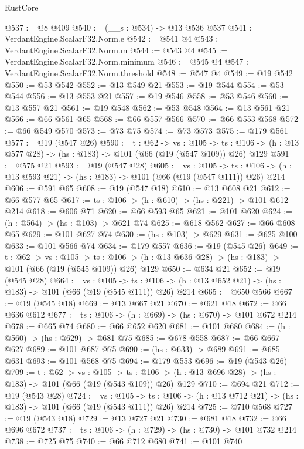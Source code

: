 \begin{lexlean}{RustCore}
\begin{coremodule}
@537 := @8 @409
@540 := (__s : @534) -> @13 @536 @537
@541 := VerdantEngine.ScalarF32.Norm.e
@542 := @541 @4
@543 := VerdantEngine.ScalarF32.Norm.m
@544 := @543 @4
@545 := VerdantEngine.ScalarF32.Norm.minimum
@546 := @545 @4
@547 := VerdantEngine.ScalarF32.Norm.threshold
@548 := @547 @4
@549 := @19 @542
@550 := @53 @542
@552 := @13 @549 @21
@553 := @19 @544
@554 := @53 @544
@556 := @13 @553 @21
@557 := @19 @546
@558 := @53 @546
@560 := @13 @557 @21
@561 := @19 @548
@562 := @53 @548
@564 := @13 @561 @21
@566 := @66 @561 @65
@568 := @66 @557 @566
@570 := @66 @553 @568
@572 := @66 @549 @570
@573 := @73 @75
@574 := @73 @573
@575 := @179 @561
@577 := @19 (@547 @26)
@590 := {t : @62} ->
  {vs : @105} ->
  {ts : @106} -> (h : @13 @577 @28) -> (hs : @183) -> @101 (@66 (@19 (@547 @109)) @26) @129
@591 := @575 @21
@593 := @19 (@547 @28)
@605 := {vs : @105} ->
  {ts : @106} -> (h : @13 @593 @21) -> (hs : @183) -> @101 (@66 (@19 (@547 @111)) @26) @214
@606 := @591 @65
@608 := @19 (@547 @18)
@610 := @13 @608 @21
@612 := @66 @577 @65
@617 := {ts : @106} -> (h : @610) -> (hs : @221) -> @101 @612 @214
@618 := @606 @71
@620 := @66 @593 @65
@621 := @101 @620
@624 := (h : @564) -> (hs : @103) -> @621 @74
@625 := @618 @562
@627 := @66 @608 @65
@629 := @101 @627 @74
@630 := (hs : @103) -> @629
@631 := @625 @100
@633 := @101 @566 @74
@634 := @179 @557
@636 := @19 (@545 @26)
@649 := {t : @62} ->
  {vs : @105} ->
  {ts : @106} -> (h : @13 @636 @28) -> (hs : @183) -> @101 (@66 (@19 (@545 @109)) @26) @129
@650 := @634 @21
@652 := @19 (@545 @28)
@664 := {vs : @105} ->
  {ts : @106} -> (h : @13 @652 @21) -> (hs : @183) -> @101 (@66 (@19 (@545 @111)) @26) @214
@665 := @650 @566
@667 := @19 (@545 @18)
@669 := @13 @667 @21
@670 := @621 @18
@672 := @66 @636 @612
@677 := {ts : @106} -> (h : @669) -> (hs : @670) -> @101 @672 @214
@678 := @665 @74
@680 := @66 @652 @620
@681 := @101 @680
@684 := (h : @560) -> (hs : @629) -> @681 @75
@685 := @678 @558
@687 := @66 @667 @627
@689 := @101 @687 @75
@690 := (hs : @633) -> @689
@691 := @685 @631
@693 := @101 @568 @75
@694 := @179 @553
@696 := @19 (@543 @26)
@709 := {t : @62} ->
  {vs : @105} ->
  {ts : @106} -> (h : @13 @696 @28) -> (hs : @183) -> @101 (@66 (@19 (@543 @109)) @26) @129
@710 := @694 @21
@712 := @19 (@543 @28)
@724 := {vs : @105} ->
  {ts : @106} -> (h : @13 @712 @21) -> (hs : @183) -> @101 (@66 (@19 (@543 @111)) @26) @214
@725 := @710 @568
@727 := @19 (@543 @18)
@729 := @13 @727 @21
@730 := @681 @18
@732 := @66 @696 @672
@737 := {ts : @106} -> (h : @729) -> (hs : @730) -> @101 @732 @214
@738 := @725 @75
@740 := @66 @712 @680
@741 := @101 @740

\end{coremodule}
\end{lexlean}
